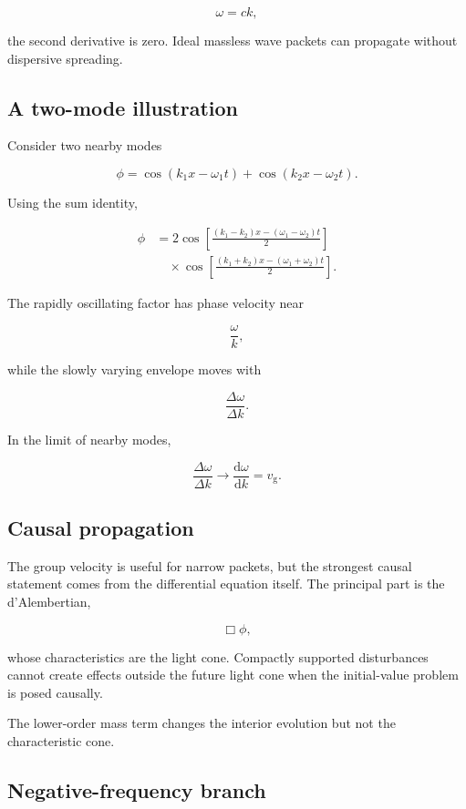 \[
\omega=ck,
\]

the second derivative is zero. Ideal massless wave packets can propagate without dispersive spreading.

\subsection{A two-mode illustration}

Consider two nearby modes

\[
\phi
=
\cos(k_{1}x-\omega_{1}t)
+
\cos(k_{2}x-\omega_{2}t).
\]

Using the sum identity,

\[
\begin{aligned}
\phi
&=
2
\cos
\left[
\frac{(k_{1}-k_{2})x
-(\omega_{1}-\omega_{2})t}{2}
\right]\\
&\quad\times
\cos
\left[
\frac{(k_{1}+k_{2})x
-(\omega_{1}+\omega_{2})t}{2}
\right].
\end{aligned}
\]

The rapidly oscillating factor has phase velocity near

\[
\frac{\omega}{k},
\]

while the slowly varying envelope moves with

\[
\frac{\Delta\omega}{\Delta k}.
\]

In the limit of nearby modes,

\[
\frac{\Delta\omega}{\Delta k}
\longrightarrow
\frac{\mathrm{d}\omega}{\mathrm{d}k}
=
v_{\mathrm{g}}.
\]

\subsection{Causal propagation}

The group velocity is useful for narrow packets, but the strongest causal statement comes from the differential equation itself. The principal part is the d'Alembertian,

\[
\Box\phi,
\]

whose characteristics are the light cone. Compactly supported disturbances cannot create effects outside the future light cone when the initial-value problem is posed causally.

The lower-order mass term changes the interior evolution but not the characteristic cone.

\subsection{Negative-frequency branch}

